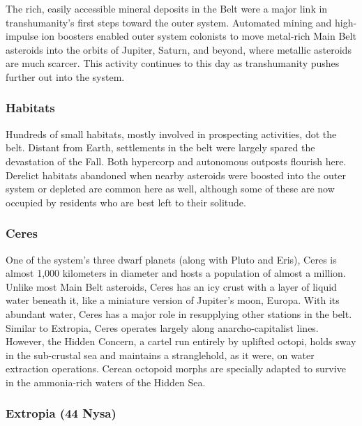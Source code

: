The rich, easily accessible mineral deposits in the Belt were a major link in transhumanity's first steps toward the outer system. Automated mining and high-impulse ion boosters enabled outer system colonists to move metal-rich Main Belt asteroids into the orbits of Jupiter, Saturn, and beyond, where metallic asteroids are much scarcer. This activity continues to this day as transhumanity pushes further out into the system. 

\subsubsection{Habitats} \label{sec:habitats-3} 

Hundreds of small habitats, mostly involved in prospecting activities, dot the belt. Distant from Earth, settlements in the belt were largely spared the devastation of the Fall. Both hypercorp and autonomous outposts flourish here. Derelict habitats abandoned when nearby asteroids were boosted into the outer system or depleted are common here as well, although some of these are now occupied by residents who are best left to their solitude. 

\subsubsection{Ceres} \label{sec:ceres} 

One of the system's three dwarf planets (along with Pluto and Eris), Ceres is almost 1,000 kilometers in diameter and hosts a population of almost a million. Unlike most Main Belt asteroids, Ceres has an icy crust with a layer of liquid water beneath it, like a miniature version of Jupiter's moon, Europa. With its abundant water, Ceres has a major role in resupplying other stations in the belt. Similar to Extropia, Ceres operates largely along anarcho-capitalist lines. However, the Hidden Concern, a cartel run entirely by uplifted octopi, holds sway in the sub-crustal sea and maintains a stranglehold, as it were, on water extraction operations. Cerean octopoid morphs are specially adapted to survive in the ammonia-rich waters of the Hidden Sea. 

\subsubsection{Extropia (44 Nysa)} \label{sec:extropia-44-nysa} 

